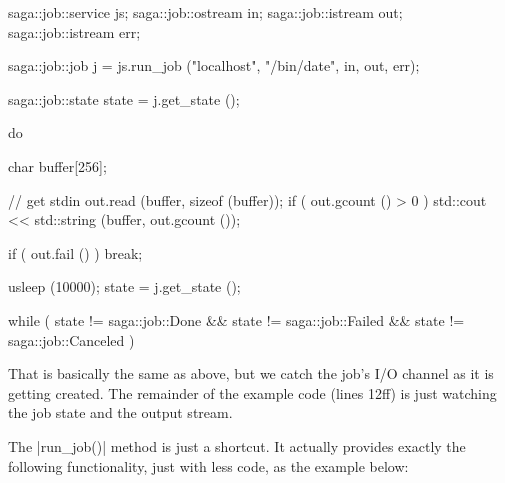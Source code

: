   \begin{mycode}[label=Job submission and job I/O]
  saga::job::service js;
  saga::job::ostream in;
  saga::job::istream out;
  saga::job::istream err;
  
  saga::job::job j = js.run_job ("localhost",
                                 "/bin/date",
                                 in, out, err);

  saga::job::state state = j.get_state ();

  do 
  {
    char buffer[256];

    // get stdin
    out.read (buffer, sizeof (buffer));
    if ( out.gcount () > 0 )
    {
      std::cout << std::string (buffer, out.gcount ());
    }
    
    if ( out.fail () )
    {
      break;
    }

    usleep (10000);
    state = j.get_state ();

  } while ( state != saga::job::Done &&
            state != saga::job::Failed &&
            state != saga::job::Canceled )
  \end{mycode}

  That is basically the same as above, but we catch the job's I/O channel
  as it is getting created.  The remainder of the example code (lines
  12ff) is just watching the job state and the output stream.

  The |run_job()| method is just a shortcut.  It actually
  provides exactly the following functionality, just with less code,
  as the example below:

